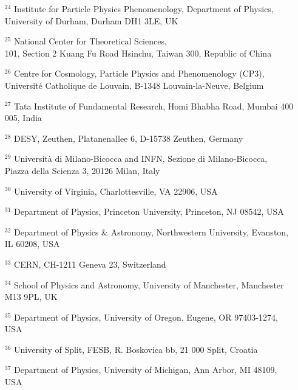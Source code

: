 \begin{itemize}
\item[$^{24}$] 
  Institute for Particle Physics Phenomenology, Department of Physics, \\
  University of Durham, Durham DH1 3LE, UK

\item[$^{25}$] 
  National Center for Theoretical Sciences, \\ 
  101, Section 2 Kuang Fu Road Hsinchu, Taiwan 300, Republic of China

\item[$^{26}$] 
  Centre for Cosmology, Particle Physics and Phenomenology (CP3), \\ 
  Universit\'e Catholique de Louvain, B-1348 Louvain-la-Neuve, Belgium

\item[$^{27}$] 
  Tata Institute of Fundamental Research, Homi Bhabha Road, Mumbai 400 005, India 

\item[$^{28}$] 
  DESY, Zeuthen, Platanenallee 6, D-15738 Zeuthen, Germany

\item[$^{29}$] 
  Universit\`a di Milano-Bicocca and INFN, Sezione di Milano-Bicocca,\\
  Piazza della Scienza 3, 20126 Milan, Italy

\item[$^{30}$] 
  University of Virginia, Charlottesville, VA 22906, USA 

\item[$^{31}$] 
  Department of Physics, Princeton University, Princeton, NJ 08542, USA

\item[$^{32}$] 
  Department of Physics \& Astronomy, Northwestern University, Evanston, IL 60208, USA

\item[$^{33}$] 
  CERN, CH-1211 Geneva 23, Switzerland 

\item[$^{34}$] 
  School of Physics and Astronomy, University of Manchester, Manchester M13 9PL, UK

\item[$^{35}$] 
  Department of Physics, University of Oregon, Eugene, OR 97403-1274, USA 

\item[$^{36}$] 
  University of Split, FESB, R. Boskovica bb, 21 000 Split, Croatia

\item[$^{37}$] 
  Department of Physics, University of Michigan, Ann Arbor, MI 48109, USA 


\end{itemize}
